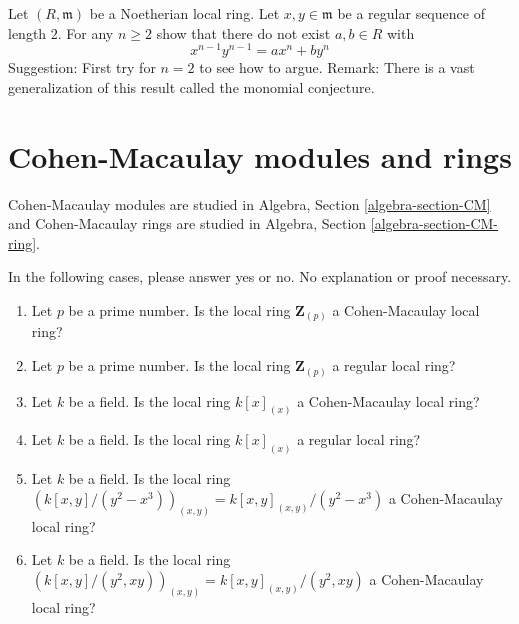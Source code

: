 \begin{exercise}
\label{exercise-depth-2}
Let $(R, \mathfrak m)$ be a Noetherian local ring.
Let $x, y \in \mathfrak m$ be a regular sequence of length $2$.
For any $n \geq 2$ show that there do not exist $a, b \in R$ with
$$
x^{n - 1}y^{n - 1} = a x^n + b y^n
$$
Suggestion: First try for $n = 2$ to see how to argue.
Remark: There is a vast generalization of this result
called the monomial conjecture.
\end{exercise}







\section{Cohen-Macaulay modules and rings}
\label{section-CM}

\noindent
Cohen-Macaulay modules are studied in
Algebra, Section \ref{algebra-section-CM}
and Cohen-Macaulay rings are studied in
Algebra, Section \ref{algebra-section-CM-ring}.

\begin{exercise}
\label{exercise-examples-CM}
In the following cases, please answer yes or no.
No explanation or proof necessary.
\begin{enumerate}
\item Let $p$ be a prime number.
Is the local ring $\mathbf{Z}_{(p)}$ a Cohen-Macaulay local ring?
\item Let $p$ be a prime number.
Is the local ring $\mathbf{Z}_{(p)}$ a regular local ring?
\item Let $k$ be a field.
Is the local ring $k[x]_{(x)}$ a Cohen-Macaulay local ring?
\item Let $k$ be a field.
Is the local ring $k[x]_{(x)}$ a regular local ring?
\item Let $k$ be a field.
Is the local ring $(k[x, y]/(y^2 - x^3))_{(x, y)} =
k[x, y]_{(x, y)}/(y^2 - x^3)$ a Cohen-Macaulay local ring?
\item Let $k$ be a field.
Is the local ring $(k[x, y]/(y^2, xy))_{(x, y)} =
k[x, y]_{(x, y)}/(y^2, xy)$ a Cohen-Macaulay local ring?
\end{enumerate}
\end{exercise}













